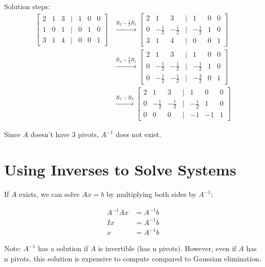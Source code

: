 \documentclass[12pt,a4paper]{article}
\begin{document}
Solution steps:
\begin{align*}
    \begin{bmatrix} 2 & 1 & 3 & | & 1 & 0 & 0 \\ 1 & 0 & 1 & | & 0 & 1 & 0 \\ 3 & 1 & 4 & | & 0 & 0 & 1 \end{bmatrix}
    &\xrightarrow{R_2 - \frac{1}{2}R_1}
    \begin{bmatrix} 2 & 1 & 3 & | & 1 & 0 & 0 \\ 0 & -\frac{1}{2} & -\frac{1}{2} & | & -\frac{1}{2} & 1 & 0 \\ 3 & 1 & 4 & | & 0 & 0 & 1 \end{bmatrix} \\
    &\xrightarrow{R_3 - \frac{3}{2}R_1}
    \begin{bmatrix} 2 & 1 & 3 & | & 1 & 0 & 0 \\ 0 & -\frac{1}{2} & -\frac{1}{2} & | & -\frac{1}{2} & 1 & 0 \\ 0 & -\frac{1}{2} & -\frac{1}{2} & | & -\frac{3}{2} & 0 & 1 \end{bmatrix} \\
    &\xrightarrow{R_3 - R_2}
    \begin{bmatrix} 2 & 1 & 3 & | & 1 & 0 & 0 \\ 0 & -\frac{1}{2} & -\frac{1}{2} & | & -\frac{1}{2} & 1 & 0 \\ 0 & 0 & 0 & | & -1 & -1 & 1 \end{bmatrix}
\end{align*}

Since $A$ doesn't have 3 pivots, $A^{-1}$ does not exist.

\section{Using Inverses to Solve Systems}

If $A$ exists, we can solve $Ax = b$ by multiplying both sides by $A^{-1}$:

\begin{align*}
    A^{-1}Ax &= A^{-1}b \\
    Ix &= A^{-1}b \\
    x &= A^{-1}b
\end{align*}

Note: $A^{-1}$ has a solution if $A$ is invertible (has n pivots). However, even if $A$ has n pivots, this solution is expensive to compute compared to Gaussian elimination.
\end{document}
